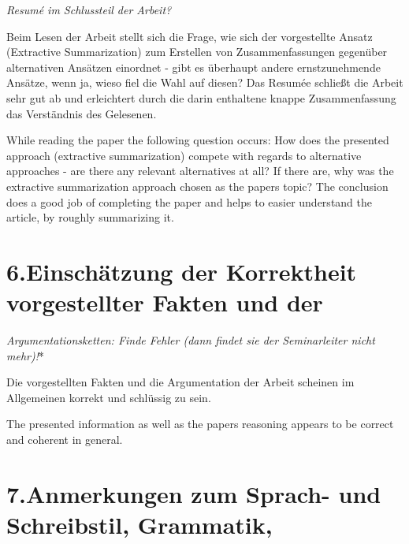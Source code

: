 \documentclass{article}
\begin{document}
\noindent{}   \emph{Resumé im Schlussteil der Arbeit?}%

   Beim Lesen der Arbeit stellt sich die Frage, wie sich der vorgestellte Ansatz (Extractive Summarization) zum Erstellen von Zusammenfassungen gegenüber alternativen Ansätzen einordnet - gibt es überhaupt andere ernstzunehmende Ansätze, wenn ja, wieso fiel die Wahl auf diesen?
   Das Resumée schließt die Arbeit sehr gut ab und erleichtert durch die darin enthaltene knappe Zusammenfassung das Verständnis des Gelesenen.%

\mdhr{}%

\noindent{}   While reading the paper the following question occurs: How does the presented approach (extractive summarization) compete with regards to alternative approaches - are there any relevant alternatives at all? If there are, why was the extractive summarization approach chosen as the papers topic?
   The conclusion does a good job of completing the paper and helps to easier understand the article, by roughly summarizing it.%

\section{6.\hspace*{0.5em}Einschätzung der Korrektheit vorgestellter Fakten und der}\label{sec-einschtzung-der-korrektheit-vorgestellter-fakten-und-der}%

\noindent{}   \emph{Argumentationsketten: Finde Fehler (dann findet sie der
   Seminarleiter nicht mehr)!}*%

   Die vorgestellten Fakten und die Argumentation der Arbeit scheinen im Allgemeinen korrekt und schlüssig zu sein.%

\mdhr{}%

\noindent{}   The presented information as well as the papers reasoning appears to be correct and coherent in general.%

\section{7.\hspace*{0.5em}Anmerkungen zum Sprach- und Schreibstil, Grammatik,}\label{sec-anmerkungen-zum-sprach--und-schreibstil-grammatik}%
\end{document}
